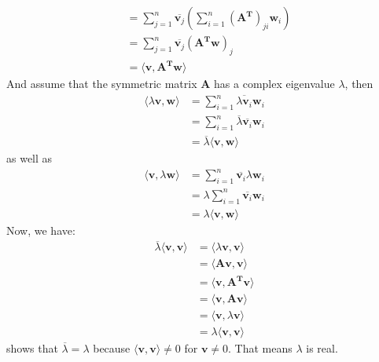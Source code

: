 \documentclass[oneside]{book}
\begin{document}
{{{\begin{align}
                &=\sum_{j=1}^{n}\overline{\mathbf{v}_{j}}\left(\sum_{i=1}^{n}(\mathbf{A}^{\mathbf{T}})_{ji}\mathbf{w}_{i}\right)\\
                &=\sum_{j=1}^{n}\overline{\mathbf{v}_{j}}\left(\mathbf{A}^{\mathbf{T}}\mathbf{w}\right)_{j}\\
                &=\langle\mathbf{v},\mathbf{A}^{\mathbf{T}}\mathbf{w}\rangle
        \end{align}
        And assume that the symmetric matrix $\mathbf{A}$ has a complex eigenvalue $\lambda$, then
        \begin{align}
            \langle\lambda\mathbf{v},\mathbf{w}\rangle
                &=\sum_{i=1}^{n}\overline{\lambda\mathbf{v}_{i}}\mathbf{w}_{i}\\
                &=\sum_{i=1}^{n}\overline{\lambda}\overline{\mathbf{v}_{i}}\mathbf{w}_{i}\\
                &=\overline{\lambda}\langle\mathbf{v},\mathbf{w}\rangle
        \end{align}
        as well as
        \begin{align}
            \langle\mathbf{v},\lambda\mathbf{w}\rangle
                &=\sum_{i=1}^{n}\overline{\mathbf{v}_{i}}\lambda\mathbf{w}_{i}\\
                &=\lambda\sum_{i=1}^{n}\overline{\mathbf{v}_{i}}\mathbf{w}_{i}\\
                &=\lambda\langle\mathbf{v},\mathbf{w}\rangle
        \end{align}
        Now, we have:
        \begin{align}
            \overline{\lambda}\langle\mathbf{v},\mathbf{v}\rangle
                &=\langle\lambda\mathbf{v},\mathbf{v}\rangle\\
                &=\langle\mathbf{A}\mathbf{v},\mathbf{v}\rangle\\
                &=\langle\mathbf{v},\mathbf{A}^{\mathbf{T}}\mathbf{v}\rangle\\
                &=\langle\mathbf{v},\mathbf{A}\mathbf{v}\rangle\\
                &=\langle\mathbf{v},\lambda\mathbf{v}\rangle\\
                &=\lambda\langle\mathbf{v},\mathbf{v}\rangle
        \end{align}
        shows that $\overline{\lambda}=\lambda$ because $\langle\mathbf{v},\mathbf{v}\rangle\neq0$ for $\mathbf{v}\neq0$. That means $\lambda$ is real.
    }

}}
\end{document}
